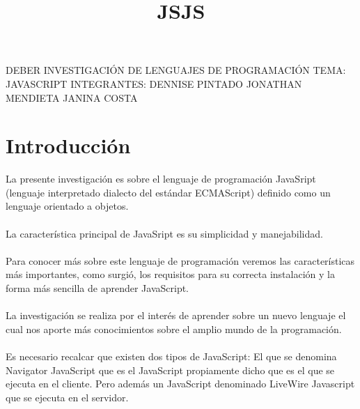 \documentclass[11pt]{article} %
\title{JS}
\begin{document}
\maketitle



DEBER
INVESTIGACIÓN
\newline
\newline
DE 
\newline
\newline
 LENGUAJES DE PROGRAMACIÓN
\newline
\newline
TEMA:  JAVASCRIPT
\newline
\newline
INTEGRANTES: 
\newline
\newline
DENNISE PINTADO
\newline
\newline
JONATHAN MENDIETA
\newline
\newline
JANINA COSTA
\newline
\newline

\newpage
\title{JS}

\section{Introducción}
La presente investigación es sobre el lenguaje de programación JavaSript  (lenguaje interpretado  dialecto del estándar ECMAScript) definido como un lenguaje orientado a objetos.\\
\\La característica principal de JavaSript es su simplicidad y manejabilidad.\\
\\Para conocer más sobre este lenguaje de programación veremos las características más importantes,  como surgió, los requisitos para su correcta instalación y la forma más sencilla de aprender JavaScript. \\
\\La investigación se realiza por el interés de aprender sobre un nuevo lenguaje el cual nos aporte más conocimientos sobre el amplio mundo de la programación.\\
\\Es necesario recalcar que existen dos tipos de JavaScript: El que se denomina Navigator JavaScript que es el JavaScript propiamente dicho que es el que se ejecuta en el cliente. Pero además un JavaScript denominado LiveWire Javascript que se ejecuta en el servidor.\\
\\ \\
\end{document}
